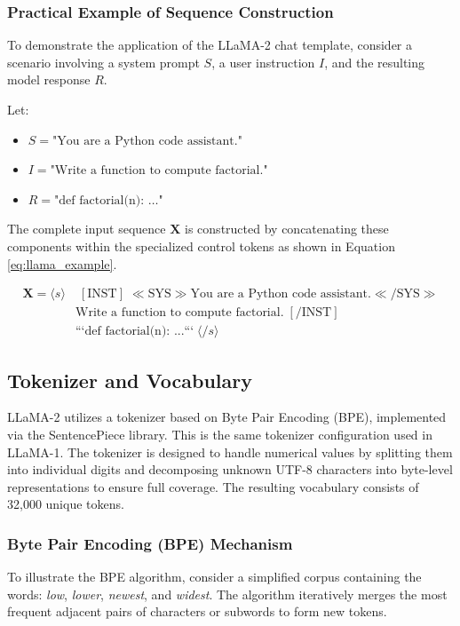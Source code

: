 \subsubsection{Practical Example of Sequence Construction}

To demonstrate the application of the LLaMA-2 chat template, consider a scenario involving a system prompt $S$, a user instruction $I$, and the resulting model response $R$.

Let:
\begin{itemize}
    \item $S = \text{"You are a Python code assistant."}$
    \item $I = \text{"Write a function to compute factorial."}$
    \item $R = \text{"def factorial(n): \ldots"}$
\end{itemize}

The complete input sequence $\mathbf{X}$ is constructed by concatenating these components within the specialized control tokens as shown in Equation \ref{eq:llama_example}.

\begin{equation}
\label{eq:llama_example}
\begin{aligned}
\mathbf{X} = \langle s \rangle & \; [\text{INST}] \; \ll \text{SYS} \gg \text{You are a Python code assistant.} \ll / \text{SYS} \gg \\
& \text{Write a function to compute factorial.} \; [/ \text{INST}] \\
& \text{```def factorial(n): ...```} \; \langle /s \rangle
\end{aligned}
\end{equation}


\subsection{Tokenizer and Vocabulary}
LLaMA-2 utilizes a tokenizer based on Byte Pair Encoding (BPE), implemented via the SentencePiece library. This is the same tokenizer configuration used in LLaMA-1. The tokenizer is designed to handle numerical values by splitting them into individual digits and decomposing unknown UTF-8 characters into byte-level representations to ensure full coverage. The resulting vocabulary consists of 32,000 unique tokens.

\subsubsection{Byte Pair Encoding (BPE) Mechanism}
To illustrate the BPE algorithm, consider a simplified corpus containing the words: \textit{low}, \textit{lower}, \textit{newest}, and \textit{widest}. The algorithm iteratively merges the most frequent adjacent pairs of characters or subwords to form new tokens.



